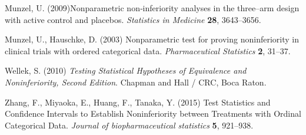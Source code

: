 \documentclass[bimj,fleqn]{w-art}\usepackage[]{graphicx}\usepackage[]{color}
\theoremstyle{plain}
\theoremstyle{definition}
\begin{document}
\begin{thebibliography}{10}
Munzel, U. (2009)Nonparametric non‐inferiority analyses in the three--arm design
with active control and placebos.
\textit{Statistics in Medicine} \textbf{28}, 3643--3656.

Munzel, U., Hauschke, D. (2003) Nonparametric test for proving noninferiority in clinical trials with ordered categorical data.
\textit{Pharmaceutical Statistics} \textbf{2}, 31--37.

Wellek, S. (2010) \textit{Testing Statistical Hypotheses of Equivalence and
Noninferiority, Second Edition}.
Chapman and Hall / CRC, Boca Raton.

Zhang, F., Miyaoka, E., Huang, F.,  Tanaka, Y. (2015)  Test Statistics and
Confidence Intervals to Establish Noninferiority between Treatments with Ordinal
Categorical Data. \textit{Journal of biopharmaceutical statistics} \textbf{5}, 921--938.



\end{thebibliography}
\phantom{aaaa}
\end{document}
